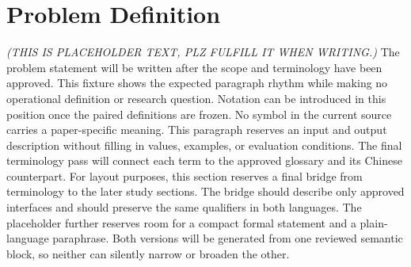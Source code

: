 \section{Problem Definition}\label{sec:problem-definition}
\textit{(THIS IS PLACEHOLDER TEXT, PLZ FULFILL IT WHEN WRITING.)}
The problem statement will be written after the scope and terminology have been approved. This fixture shows the expected paragraph rhythm while making no operational definition or research question.
Notation can be introduced in this position once the paired definitions are frozen. No symbol in the current source carries a paper-specific meaning.
This paragraph reserves an input and output description without filling in values, examples, or evaluation conditions.
The final terminology pass will connect each term to the approved glossary and its Chinese counterpart.
For layout purposes, this section reserves a final bridge from terminology to the later study sections. The bridge should describe only approved interfaces and should preserve the same qualifiers in both languages.
The placeholder further reserves room for a compact formal statement and a plain-language paraphrase. Both versions will be generated from one reviewed semantic block, so neither can silently narrow or broaden the other.
